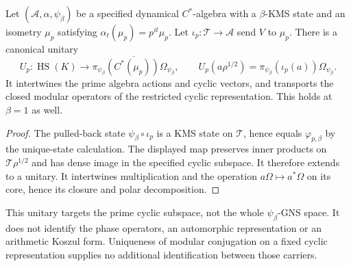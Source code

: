 \begin{theorem}
\label{v4-arith:kms-gns:thm:KMS1-GNS-BC-identification}
Let \((\mathcal A,\alpha,\psi_\beta)\) be a specified dynamical
\(C^*\)-algebra with a \(\beta\)-KMS state and an isometry
\(\mu_p\) satisfying \(\alpha_t(\mu_p)=p^{it}\mu_p\).
Let \(\iota_p:\mathcal T\to\mathcal A\) send \(V\) to \(\mu_p\).
There is a canonical unitary
\[
U_p:\operatorname{HS}(K)\longrightarrow
\overline{\pi_{\psi_\beta}(C^*(\mu_p))\Omega_{\psi_\beta}},\qquad
U_p(a\rho^{1/2})=\pi_{\psi_\beta}(\iota_p(a))\Omega_{\psi_\beta}.
\]
It intertwines the prime algebra actions and cyclic vectors, and
transports the closed modular operators of the restricted cyclic
representation. This holds at \(\beta=1\) as well.
\end{theorem}
\begin{proof}
The pulled-back state \(\psi_\beta\circ\iota_p\) is a KMS state
on \(\mathcal T\), hence equals \(\varphi_{p,\beta}\) by the
unique-state calculation. The displayed map preserves inner
products on \(\mathcal T\rho^{1/2}\) and has dense image in the
specified cyclic subspace. It therefore extends to a unitary.
It intertwines multiplication and the operation
\(a\Omega\mapsto a^*\Omega\) on its core, hence its closure and
polar decomposition.
\end{proof}

\begin{remark}
\label{v4-arith:kms-gns:rem:uniqueness}
This unitary targets the prime cyclic subspace, not the whole
\(\psi_\beta\)-GNS space. It does not identify the phase operators,
an automorphic representation or an arithmetic Koszul form.
Uniqueness of modular conjugation on a fixed cyclic representation
supplies no additional identification between those carriers.
\end{remark}

